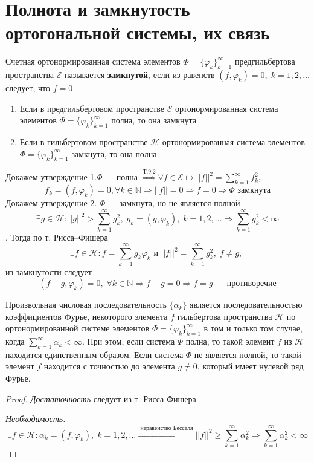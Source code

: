 \section{Полнота и замкнутость ортогональной системы, их связь}
\begin{greyDefinition} Счетная ортонормированная система элементов $ \Phi = \{ \varphi_k \}_{k=1}^\infty $ предгильбертова пространства $ \mathcal{E} $ называется \textbf{замкнутой}, если из равенств $ \left( f ,\varphi_k \right)=0,\; k=1,2,\ldots $ следует, что $ f = 0 $
\end{greyDefinition}
\begin{greyTheorem}
	\begin{enumerate}
		\item Если в предгильбертовом пространстве $ \mathcal{E} $ ортонормированная система элементов $ \Phi = \{ \varphi_k \}_{k=1}^\infty $ полна, то она замкнута
		\item Если в гильбертовом пространстве $ \mathcal{H} $ ортонормированная система элементов $ \Phi = \{ \varphi_k \}_{k=1}^\infty $ замкнута, то она полна.
	\end{enumerate}
\end{greyTheorem}
\begin{greyProof}
	Докажем утверждение 1.$ \Phi $ --- полна $ \overset{\text{Т.9.2}}{\Rightarrow} \forall f \in \mathcal{E} \mapsto ||f||^2 = \sum_{k=1}^\infty f_k^2,$
	\[
		 f_k = (f,\varphi_k)=0, \forall k \in \mathbb{N} \Rightarrow ||f||=0 \Rightarrow f=0 \Rightarrow \Phi \text{ замкнута}
	\]
	Докажем утверждение 2. $ \Phi $ --- замкнута, но не является полной
	\[
		\exists g \in \mathcal{H}: ||g||^2 > \sum_{k=1}^\infty g_k^2 ,\; g_k =(g,\varphi_k),\; k=1,2,\ldots \Rightarrow \sum_{k=1}^\infty g_k^2 < \infty 
	\]
	. Тогда по т. Рисса--Фишера
	\[
		\exists f\in \mathcal{H}: f = \sum_{k=1}^\infty g_k\varphi_k \text{ и }	||f||^2 = \sum_{k=1}^\infty g_k^2,\; f\neq g,\; 
	\]
	из замкнутости следует
	\[
		(f-g,\varphi_k) =0,\;  \forall k \in \mathbb{N} \Rightarrow f - g =0 \Rightarrow f=g\text{ --- противоречие}
	\]
\end{greyProof}
\begin{theorem}
	Произвольная числовая последовательность $ \{ \alpha_k \} $ является последовательностью коэффициентов Фурье, некоторого элемента $ f $ гильбертова пространства $ \mathcal{H} $ по ортонормированной системе элементов $ \Phi = \{ \varphi_k  \}_{k=1}^\infty $ в том и только том случае, когда $ \sum_{k=1}^\infty \alpha_k < \infty $. При этом, если система $ \Phi $ полна, то такой элемент $ f $ из $ \mathcal{H} $ находится единственным образом. Если система $ \Phi $ не является полной, то такой элемент $ f $ находится с точностью до элемента $ g\neq 0 $, который имеет нулевой ряд Фурье.
\end{theorem}
\begin{proof}
	\textit{Достаточность} следует из т. Рисса-Фишера
		
	\textit{Необходимость.} $$ \exists f \in \mathcal{H}: \alpha_k = (f,\varphi_k),\; k=1,2,\ldots 
\overset{\text{ неравенство Бесселя}}{\Longrightarrow} ||f||^2 \geqslant \sum_{k=1}^\infty \alpha_k^2 \Rightarrow \sum_{k=1}^\infty \alpha_k^2 < \infty$$
\end{proof}
